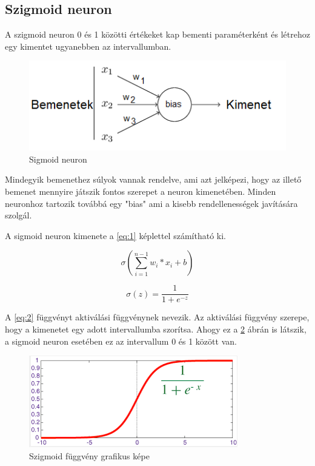 \subsection{Szigmoid neuron}

A szigmoid neuron 0 és 1 közötti értékeket kap bementi paraméterként és létrehoz egy kimentet ugyanebben az intervallumban.

\begin{figure}[h]
\centering

\includegraphics[scale=1]{images/neuron}
\caption{Sigmoid neuron}

\label{fig:neuron}
\end{figure}

Mindegyik bemenethez súlyok vannak rendelve, ami azt jelképezi, hogy az illető bemenet mennyire játszik fontos szerepet a neuron kimenetében. Minden neuronhoz tartozik továbbá egy "bias" ami a kisebb rendellenességek javítására szolgál.

A sigmoid neuron kimenete a \ref{eq:1} képlettel számítható ki.

\begin{equation} \label{eq:1}
\sigma(\sum\limits_{i=1}^{n-1} w_{i}*x_{i} + b)
\end{equation}

\begin{equation} \label{eq:2}
\sigma(z) = \frac{1}{1+e^{-z}}
\end{equation}

A \ref{eq:2} függvényt aktiválási függvénynek nevezik. Az aktiválási függvény szerepe, hogy a kimenetet egy adott intervallumba szorítsa. Ahogy ez a \ref{fig:sigmoidf} ábrán is látszik, a sigmoid neuron esetében ez az intervallum 0 és 1 között van. 

\begin{figure}[h]
\centering

\includegraphics[scale=1]{images/sigmoidf}
\caption{Szigmoid függvény grafikus képe}

\label{fig:sigmoidf}
\end{figure}

